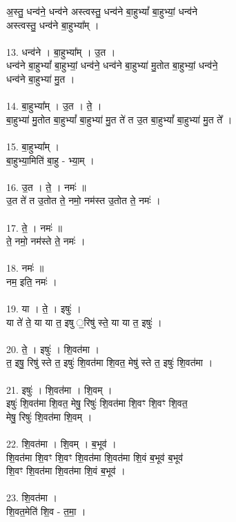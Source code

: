 अ॒स्तु॒ धन्व॑ने॒ धन्व॑ने अस्त्वस्तु॒ धन्व॑ने बा॒हुभ्यां᳚ बा॒हुभ्यां॒ धन्व॑ने\\
अस्त्वस्तु॒ धन्व॑ने बा॒हुभ्या᳚म् ।\\
\\
13. धन्व॑ने । बा॒हुभ्या᳚म् । उ॒त ।\\
धन्व॑ने बा॒हुभ्यां᳚ बा॒हुभ्यां॒ धन्व॑ने॒ धन्व॑ने बा॒हुभ्या॑ मु॒तोत बा॒हुभ्यां॒ धन्व॑ने॒\\
धन्व॑ने बा॒हुभ्या॑ मु॒त ।\\
\\
14. बा॒हुभ्या᳚म् । उ॒त । ते॒ ।\\
बा॒हुभ्या॑ मु॒तोत बा॒हुभ्यां᳚ बा॒हुभ्या॑ मु॒त ते॑ त उ॒त बा॒हुभ्यां᳚ बा॒हुभ्या॑ मु॒त ते᳚ ।\\
\\
15. बा॒हुभ्या᳚म् ।\\
बा॒हुभ्या॒मिति॑ बा॒हु - भ्या॒म् ।\\
\\
16. उ॒त । ते॒ । नमः॑ ॥\\
उ॒त ते॑ त उ॒तोत ते॒ नमो॒ नम॑स्त उ॒तोत ते॒ नमः॑ ।\\
\\
17. ते॒ । नमः॑ ॥\\
ते॒ नमो॒ नम॑स्ते ते॒ नमः॑ ।\\
\\
18. नमः॑ ॥\\
नम॒ इति॒ नमः॑ ।\\
\\
19. या । ते॒ । इषुः॑ ।\\
या ते॑ ते॒ या या त॒ इषु ॒रिषु॑ स्ते॒ या या त॒ इषुः॑ ।\\
\\
20. ते॒ । इषुः॑ । शि॒वत॑मा ।\\
त॒ इषु॒ रिषु॑ स्ते त॒ इषुः॑ शि॒वत॑मा शि॒वत॒ मेषु॑ स्ते त॒ इषुः॑ शि॒वत॑मा ।\\
\\
21. इषुः॑ । शि॒वत॑मा । शि॒वम् ।\\
इषुः॑ शि॒वत॑मा शि॒वत॒ मेषु॒ रिषुः॑ शि॒वत॑मा शि॒वꣳ शि॒वꣳ शि॒वत॒\\
मेषु॒ रिषुः॑ शि॒वत॑मा शि॒वम् ।\\
\\
22. शि॒वत॑मा । शि॒वम् । ब॒भूव॑ ।\\
शि॒वत॑मा शि॒वꣳ शि॒वꣳ शि॒वत॑मा शि॒वत॑मा शि॒वं ब॒भूव॑ ब॒भूव॑\\
शि॒वꣳ शि॒वत॑मा शि॒वत॑मा शि॒वं ब॒भूव॑ ।\\
\\
23. शि॒वत॑मा ।\\
शि॒वत॒मेति॑ शि॒व - त॒मा॒ ।\\
